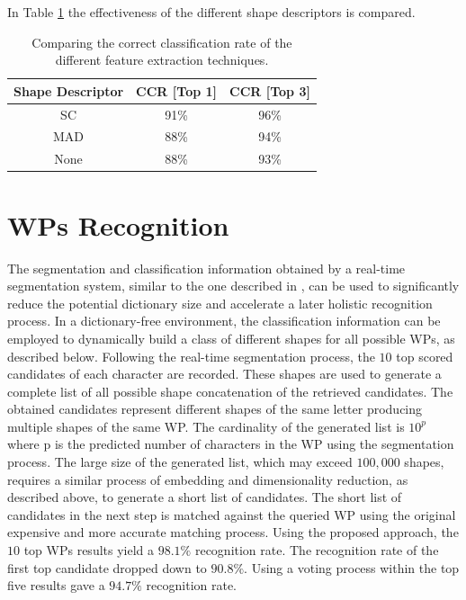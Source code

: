 \documentclass[10pt, conference, compsocconf]{IEEEtran}
\begin{document}
In Table \ref{table:features_comparison} the effectiveness of the different shape descriptors is compared. 
\begin{table}
\centering
\begin{tabular}{ | c | c | c |}
\hline
	\textbf{Shape Descriptor}  & \textbf{CCR [Top 1]}  & \textbf{CCR [Top 3]} \\
	\hline 
	SC      & 91\% & 96\%  \\                
  	\hline
  	MAD     & 88\% & 94\% \\
  	\hline
  	None    & 88\% &  93\% \\
  	\hline
\end{tabular}
\caption{Comparing the correct classification rate of the different feature extraction techniques.}
\label{table:features_comparison} 
\end{table}

\section{WPs Recognition}
\label{sec:wps_recognition}
The segmentation and classification information obtained by a real-time segmentation system, similar to the one described in \cite{kour2014real}, can be used to significantly reduce the potential dictionary size and accelerate a later holistic recognition process.
In a dictionary-free environment, the classification information can be employed to dynamically build a class of different shapes for all possible WPs, as described below.
Following the real-time segmentation process, the $10$ top scored candidates of each character are recorded. 
These shapes are used to generate a complete list of all possible shape concatenation of the retrieved candidates. 
The obtained candidates represent different shapes of the same letter producing multiple shapes of the same WP. 
The cardinality of the generated list is $10^p$ where p is the predicted number of characters in the WP using the segmentation process. 
The large size of the generated list, which may exceed $100,000$ shapes, requires a similar process of embedding and dimensionality reduction, as described above, to generate a short list of candidates. 
The short list of candidates in the next step is matched against the queried WP using the original expensive and more accurate matching process. 
Using the proposed approach, the $10$ top WPs results yield a $98.1\%$ recognition rate. 
The recognition rate of the first top candidate dropped down to $90.8\%$. 
Using a voting process within the top five results gave a $94.7\%$ recognition rate. 
\end{document}
